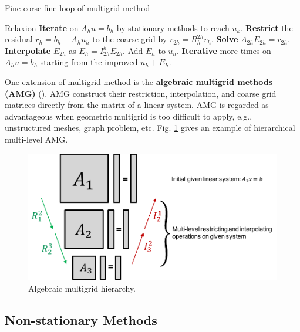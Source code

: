\begin{algorithm}[htbp]{}
	\caption{Fine-corse-fine loop of multigrid method}   
	\label{alg:v-cycle}   
	\begin{algorithmic}[1]
		
		\State Relaxion \textbf{Iterate} on $A_hu=b_h$ by stationary methods to reach $u_k$.
		\State \textbf{Restrict} the residual $r_h = b_h - A_hu_h$ to the coarse grid by $r_{2h}=R_h^{2h}r_h$.
		\State \textbf{Solve} $A_{2h}E_{2h}=r_{2h}$.
		\State \textbf{Interpolate} $E_{2h}$ as $E_h=I^{h}_{2h}E_{2h}$. Add $E_h$ to $u_h$.
		\State \textbf{Iterative} more times on $A_hu=b_h$ starting from the improved $u_h+E_h$.
		
	\end{algorithmic}  
\end{algorithm}


One extension of multigrid method is the \textbf{algebraic multigrid methods (AMG)} (\cite{ruge1987algebraic, vanvek1996algebraic, brandt1986algebraic,brezina2001algebraic}). AMG construct their restriction, interpolation, and coarse grid matrices directly from the matrix of a linear system. AMG is regarded as advantageous when geometric multigrid is too difficult to apply, e.g., unstructured meshes, graph problem, etc.  Fig. \ref{multilevel-amg} gives an example of hierarchical multi-level AMG.

\begin{figure}[htbp]
	\centering
	\includegraphics[width=5.6in]{fig/multilevel-amg.pdf}
	\caption{Algebraic multigrid hierarchy.}
	\label{multilevel-amg}
\end{figure}

\subsection{Non-stationary Methods}

